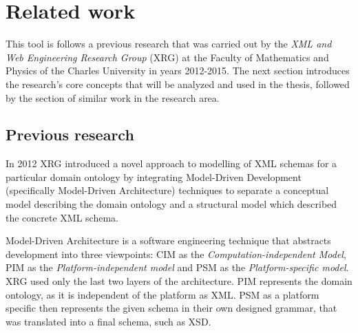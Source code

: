 \chapter{Related work}
\label{chapters:related-work}

This tool is follows a previous research that was carried out by the \textit{XML and Web Engineering Research Group} (XRG) at the Faculty of Mathematics and Physics of the Charles University  in years 2012-2015. The next section introduces the research's core concepts that will be analyzed and used in the thesis, followed by the section of similar work in the research area.

\section{Previous research}

In 2012 XRG introduced a novel approach to modelling of XML schemas \cite{necasky2012conceptual} for a particular domain ontology by integrating Model-Driven Development (specifically Model-Driven Architecture) techniques to separate a conceptual model describing the domain ontology and a structural model which described the concrete XML schema.

Model-Driven Architecture is a software engineering technique that abstracts development into three viewpoints: CIM as the \textit{Computation-independent Model}, PIM as the \textit{Platform-independent model} and PSM as the \textit{Platform-specific model}. XRG used only the last two layers of the architecture. PIM represents the domain ontology, as it is independent of the platform as XML. PSM as a platform specific then represents the given schema in their own designed grammar, that was translated into a final schema, such as XSD.

